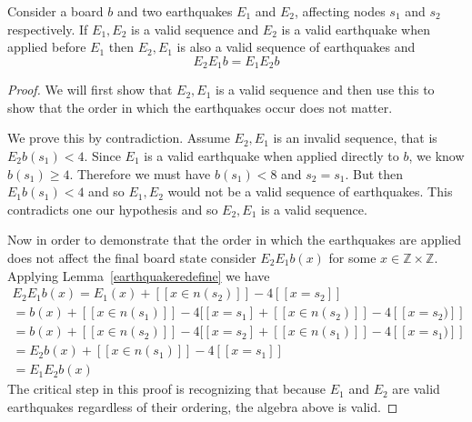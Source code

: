 \documentclass[runningheads,a4paper]{llncs}
\begin{document}
\begin{lemma}
\label{swappinglemma}
Consider a board $b$ and two earthquakes $E_1$ and $E_2$, affecting nodes $s_1$ and $s_2$ respectively. If $E_1, E_2$ is a valid sequence and $E_2$ is a valid earthquake when applied before $E_1$ then $E_2, E_1$ is also a valid sequence of earthquakes and 
\begin{equation*}
E_2 E_1 b = E_1 E_2 b
\end{equation*}
\end{lemma}
\begin{proof}
We will first show that $E_2, E_1$ is a valid sequence and then use this to show that the order in which the earthquakes occur does not matter. 

We prove this by contradiction. Assume $E_2, E_1$ is an invalid sequence, that is $E_2 b(s_1)<4$. Since $E_1$ is a valid earthquake when applied directly to $b$, we know $b(s_1) \geq 4 $. 
Therefore we must have $b(s_1)<8$ and $s_2=s_1$. But then $E_1 b(s_1)<4$ and so $E_1, E_2$ would not be a valid sequence of earthquakes. This contradicts one our hypothesis and so $E_2, E_1$ is a valid sequence. 

Now in order to demonstrate that the order in which the earthquakes are applied does not affect the final board state consider $E_2 E_1 b(x)$ for some $x \in \mathbb{Z} \times \mathbb{Z}$. Applying Lemma~\ref{earthquakeredefine} we have 
\begin{align*}
E_2 E_1 b (x) = E_1(x)  + [[ x \in n(s_2) ]] - 4[[ x=s_2]] \\
= b(x) + [[ x \in n(s_1) ]] - 4[[x = s_1] + [[ x \in n(s_2) ]] - 4[[ x= s_2)]]  \\
= b(x) + [[ x \in n(s_2) ]] - 4[[x = s_2] + [[ x \in n(s_1) ]] - 4[[ x= s_1)]]\\
= E_2 b(x) + [[ x \in n(s_1) ]] - 4[[ x = s_1]] \\
= E_1 E_2 b(x) 
\end{align*}
The critical step in this proof is recognizing that because $E_1$ and $E_2$ are valid earthquakes regardless of their ordering, the algebra above is valid.
\end{proof}
\end{document}
